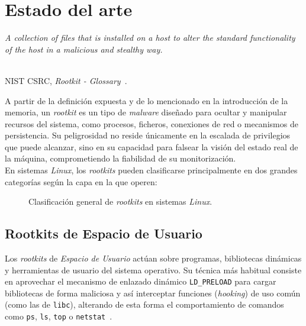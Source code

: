 \chapter{Estado del arte}
\label{cap:capitulo3}

\begin{flushright}
\begin{minipage}[]{10cm}
\emph{\guillemotleft A collection of files that is installed on a host to alter the standard functionality of the host in a malicious and stealthy way.\guillemotright}\\
\end{minipage}\\

NIST CSRC, \textit{Rootkit - Glossary}~\cite{nist_rootkit}.\\
\end{flushright}

A partir de la definición expuesta y de lo mencionado en la introducción de la memoria, un \textit{rootkit} es un tipo de \textit{malware} diseñado para ocultar y manipular recursos del sistema, como procesos, ficheros, conexiones de red o mecanismos de persistencia.
Su peligrosidad no reside únicamente en la escalada de privilegios que puede alcanzar, sino en su capacidad para falsear la visión del estado real de la máquina, comprometiendo la fiabilidad de su monitorización.\\

En sistemas \textit{Linux}, los \textit{rootkits} pueden clasificarse principalmente en dos grandes categorías según la capa en la que operen:\\

\begin{figure}[h!]
  \centering
  \scalebox{0.84}{}
  \caption{Clasificación general de \textit{rootkits} en sistemas \textit{Linux}.}
  \label{fig:rootkits_types}
\end{figure}

\section{Rootkits de Espacio de Usuario}
\label{sec:user_rootkits}

Los \textit{rootkits} de \textit{Espacio de Usuario} actúan sobre programas, bibliotecas dinámicas y herramientas de usuario del sistema operativo.
Su técnica más habitual consiste en aprovechar el mecanismo de enlazado dinámico \texttt{LD\_PRELOAD} para cargar bibliotecas de forma maliciosa y así interceptar funciones (\textit{hooking}) de uso común (como las de \texttt{libc}),
alterando de esta forma el comportamiento de comandos como \texttt{ps}, \texttt{ls}, \texttt{top} o \texttt{netstat}~\cite{rootkits}.\\

